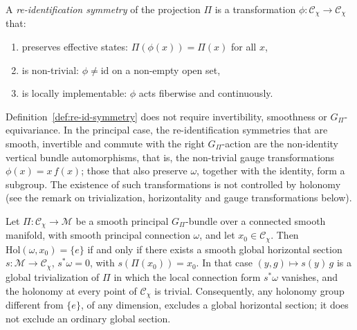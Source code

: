     \begin{definition}
      \label{def:re-id-symmetry}
      A \emph{re-identification symmetry} of the projection $\Pi$ is a transformation
      $\phi : \mathcal{C}_\chi \to \mathcal{C}_\chi$ that:
      \begin{enumerate}[label=(\roman*)]
  \item preserves effective states: $\Pi(\phi(x)) = \Pi(x)$ for all $x$,
  \item is non-trivial: $\phi \neq \mathrm{id}$ on a non-empty open set,
  \item is locally implementable: $\phi$ acts fiberwise and continuously.
      \end{enumerate}
    \end{definition}

    Definition~\ref{def:re-id-symmetry} does not require invertibility, smoothness or $G_\Pi$-equivariance.
    In the principal case, the re-identification symmetries that are smooth, invertible and commute with the
    right $G_\Pi$-action are the non-identity vertical bundle automorphisms, that is, the non-trivial gauge
    transformations $\phi(x) = x\, f(x)$; those that also preserve $\omega$, together with the identity, form a
    subgroup.
    The existence of such transformations is not controlled by holonomy (see the remark on trivialization,
    horizontality and gauge transformations below).

    \begin{proposition}
      \label{prop:holonomy-gauge}
      Let $\Pi : \mathcal{C}_\chi \to \mathcal{M}$ be a smooth principal $G_\Pi$-bundle over a connected smooth
      manifold, with smooth principal connection $\omega$, and let $x_0 \in \mathcal{C}_\chi$.
      Then $\mathrm{Hol}(\omega, x_0) = \{e\}$ if and only if there exists a smooth global horizontal section
      $s : \mathcal{M} \to \mathcal{C}_\chi$, $s^*\omega = 0$, with $s(\Pi(x_0)) = x_0$.
      In that case $(y, g) \mapsto s(y)\, g$ is a global trivialization of $\Pi$ in which the local connection form
      $s^*\omega$ vanishes, and the holonomy at every point of $\mathcal{C}_\chi$ is trivial.
      Consequently, any holonomy group different from $\{e\}$, of any dimension, excludes a global horizontal
      section; it does not exclude an ordinary global section.
    \end{proposition}

